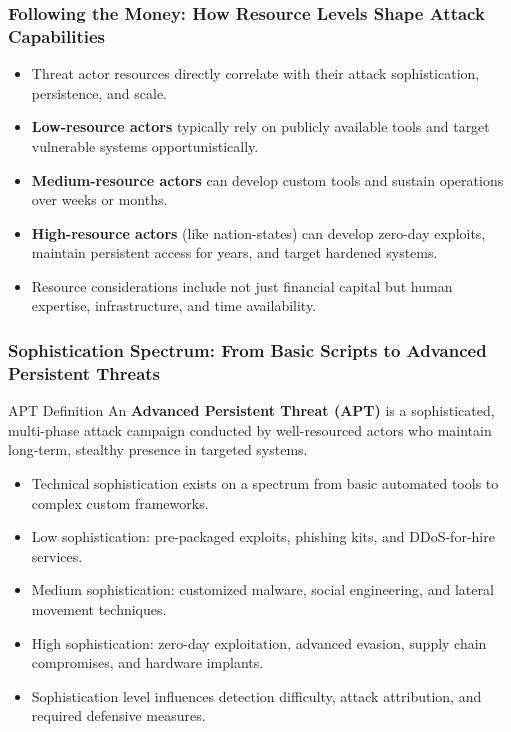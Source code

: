 \documentclass{beamer}
\begin{document}
\begin{frame}
    \frametitle{Following the Money: How Resource Levels Shape Attack Capabilities}
    
    \begin{itemize}
        \item Threat actor resources directly correlate with their attack sophistication, persistence, and scale.
        \item \textbf{Low-resource actors} typically rely on publicly available tools and target vulnerable systems opportunistically.
        \item \textbf{Medium-resource actors} can develop custom tools and sustain operations over weeks or months.
        \item \textbf{High-resource actors} (like nation-states) can develop zero-day exploits, maintain persistent access for years, and target hardened systems.
        \item Resource considerations include not just financial capital but human expertise, infrastructure, and time availability.
    \end{itemize}
\end{frame}

\begin{frame}
    \frametitle{Sophistication Spectrum: From Basic Scripts to Advanced Persistent Threats}
    
    \begin{block}{APT Definition}
        An \textbf{Advanced Persistent Threat (APT)} is a sophisticated, multi-phase attack campaign conducted by well-resourced actors who maintain long-term, stealthy presence in targeted systems.
    \end{block}
    
    \begin{itemize}
        \item Technical sophistication exists on a spectrum from basic automated tools to complex custom frameworks.
        \item Low sophistication: pre-packaged exploits, phishing kits, and DDoS-for-hire services.
        \item Medium sophistication: customized malware, social engineering, and lateral movement techniques.
        \item High sophistication: zero-day exploitation, advanced evasion, supply chain compromises, and hardware implants.
        \item Sophistication level influences detection difficulty, attack attribution, and required defensive measures.
    \end{itemize}
\end{frame}
\end{document}
